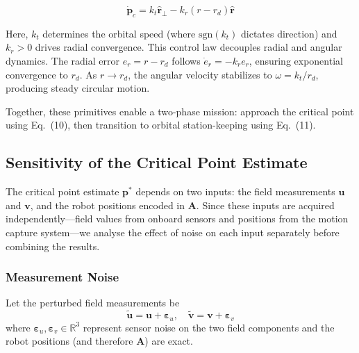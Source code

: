 \documentclass[lettersize,journal]{IEEEtran}
\begin{document}
\begin{equation}
\dot{\mathbf{p}}_c = k_t \hat{\mathbf{r}}_\perp - k_r(r - r_d)\hat{\mathbf{r}}
\end{equation}

Here, $k_t$ determines the orbital speed (where $\text{sgn}(k_t)$ dictates direction) and $k_r > 0$ drives radial convergence.
This control law decouples radial and angular dynamics. The radial error $e_r = r - r_d$ follows $\dot{e}_r = -k_r e_r$, ensuring exponential convergence to $r_d$. As $r \to r_d$, the angular velocity stabilizes to $\omega = k_t/r_d$, producing steady circular motion.

Together, these primitives enable a two-phase mission: approach the critical point using Eq.~(10), then transition to orbital station-keeping using Eq.~(11).

\subsection{Sensitivity of the Critical Point Estimate}

The critical point estimate $\mathbf{p}^*$ depends on two inputs: the field measurements $\mathbf{u}$ and $\mathbf{v}$, and the robot positions encoded in $\mathbf{A}$. Since these inputs are acquired independently---field values from onboard sensors and positions from the motion capture system---we analyse the effect of noise on each input separately before combining the results.

\subsubsection{Measurement Noise}

Let the perturbed field measurements be
\begin{equation}
    \tilde{\mathbf{u}} = \mathbf{u} + \boldsymbol{\varepsilon}_u, \quad \tilde{\mathbf{v}} = \mathbf{v} + \boldsymbol{\varepsilon}_v
    \label{eq:perturbed_meas}
\end{equation}
where $\boldsymbol{\varepsilon}_u, \boldsymbol{\varepsilon}_v \in \mathbb{R}^3$ represent sensor noise on the two field components and the robot positions (and therefore $\mathbf{A}$) are exact.
\end{document}
